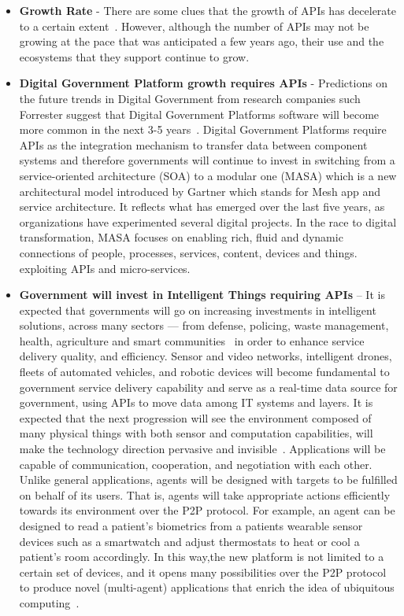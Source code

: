 \begin{itemize}
	\item \textbf{Growth Rate} - There are some clues that the growth of APIs has decelerate
	to a certain extent~\citep{api_economy}. However, although the number of APIs may not be
	growing at the pace that was anticipated a few years ago, their use and the
	ecosystems that they support continue to grow.
	
	\item \textbf{Digital Government Platform growth requires APIs} - Predictions on the
	future trends in Digital Government from research companies such Forrester
	suggest that Digital Government Platforms software will become more
	common in the next 3-5 years~\citep{gov_transformation}.
	Digital Government Platforms require APIs as the integration mechanism to transfer
	data between component systems and therefore governments will continue to
	invest in switching from a service-oriented architecture (SOA) to a modular
	one (MASA) which is a new architectural model introduced by Gartner which stands
	for Mesh app and service architecture. It reflects what has emerged over the last
	five years, as organizations have experimented several digital projects.
	In the race to digital transformation, MASA focuses on enabling rich, fluid and dynamic connections of people, processes, services, content, devices and things. exploiting APIs and micro-services. ~\citep{masa}
	
	\item \textbf{Government will invest in Intelligent Things requiring APIs} – It is
	expected that governments will go on increasing investments in intelligent
	solutions, across many sectors — from defense,	policing, waste management, health, agriculture and smart communities~\citep{trends_2017} in order to enhance service delivery quality, and efficiency. Sensor and video networks, intelligent drones, fleets of automated
	vehicles, and robotic devices will become fundamental to government service delivery
	capability and serve as a real-time data source for government, using APIs to
	move data among IT systems and layers. It is expected that the next
	progression will see the environment composed of many physical things with both
	sensor and computation capabilities, will make the technology direction
	pervasive and invisible~\citep{dzone_iot}. Applications will be capable of
	communication, cooperation, and negotiation with each other. Unlike general
	applications, agents will be designed with targets to be fulfilled on behalf
	of its users. That is, agents will take appropriate actions efficiently towards
	its environment over the P2P protocol. For example, an agent can be designed
	to read a patient’s biometrics from a patients wearable sensor devices such as
	a smartwatch and adjust thermostats to heat or cool a patient’s room accordingly.
	In this way,the new platform is not limited to a certain set of devices, and it opens many possibilities over the P2P protocol to produce novel (multi-agent) applications
	that enrich the idea of ubiquitous computing~\citep{ubiquitous_computing}.
	

\end{itemize}
